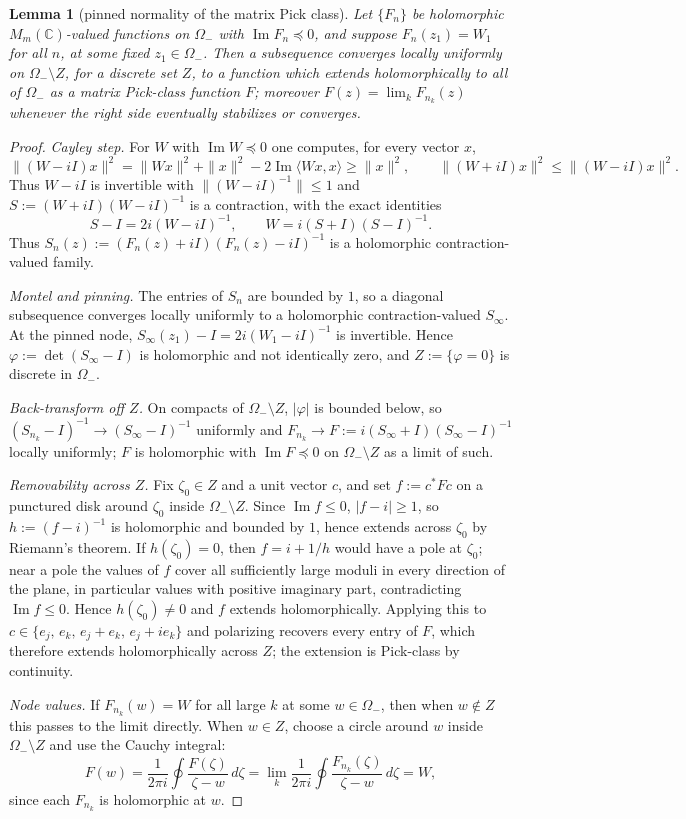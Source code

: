 \documentclass[11pt]{amsart}
\newtheorem{lemma}[theorem]{Lemma}
\theoremstyle{definition}
\theoremstyle{remark}
\theoremstyle{definition}
\renewcommand{\Im}{\operatorname{Im}}
\newcommand{\C}{\mathbb{C}}
\begin{document}
\begin{lemma}[pinned normality of the matrix Pick class]\label{lem:pinned-normality}
Let $\{F_n\}$ be holomorphic $M_m(\C)$-valued functions on $\Omega_-$ with $\Im F_n\preceq0$, and
suppose $F_n(z_1)=W_1$ for all $n$, at some fixed $z_1\in\Omega_-$.  Then a subsequence converges
locally uniformly on $\Omega_-\setminus Z$, for a discrete set $Z$, to a function which extends
holomorphically to all of $\Omega_-$ as a matrix Pick-class function $F$; moreover
$F(z)=\lim_kF_{n_k}(z)$ whenever the right side eventually stabilizes or converges.
\end{lemma}

\begin{proof}
\emph{Cayley step.}  For $W$ with $\Im W\preceq0$ one computes, for every vector $x$,
\[
   \|(W-iI)x\|^2=\|Wx\|^2+\|x\|^2-2\Im\langle Wx,x\rangle\ge\|x\|^2,
   \qquad
   \|(W+iI)x\|^2\le\|(W-iI)x\|^2 .
\]
Thus $W-iI$ is invertible with $\|(W-iI)^{-1}\|\le1$ and
$S:=(W+iI)(W-iI)^{-1}$ is a contraction, with the exact identities
\[
   S-I=2i(W-iI)^{-1},\qquad W=i(S+I)(S-I)^{-1}.
\]
Thus $S_n(z):=(F_n(z)+iI)(F_n(z)-iI)^{-1}$ is a holomorphic contraction-valued family.

\emph{Montel and pinning.}  The entries of $S_n$ are bounded by $1$, so a diagonal subsequence
converges locally uniformly to a holomorphic contraction-valued $S_\infty$.  At the pinned node,
$S_\infty(z_1)-I=2i(W_1-iI)^{-1}$ is invertible.  Hence
$\varphi:=\det(S_\infty-I)$ is holomorphic and not identically zero, and
$Z:=\{\varphi=0\}$ is discrete in $\Omega_-$.

\emph{Back-transform off $Z$.}  On compacts of $\Omega_-\setminus Z$, $|\varphi|$ is bounded below,
so $(S_{n_k}-I)^{-1}\to(S_\infty-I)^{-1}$ uniformly and
$F_{n_k}\to F:=i(S_\infty+I)(S_\infty-I)^{-1}$ locally uniformly; $F$ is holomorphic with
$\Im F\preceq0$ on $\Omega_-\setminus Z$ as a limit of such.

\emph{Removability across $Z$.}  Fix $\zeta_0\in Z$ and a unit vector $c$, and set
$f:=c^*Fc$ on a punctured disk around $\zeta_0$ inside $\Omega_-\setminus Z$.  Since
$\Im f\le0$, $|f-i|\ge1$, so $h:=(f-i)^{-1}$ is holomorphic and bounded by $1$, hence extends across
$\zeta_0$ by Riemann's theorem.  If $h(\zeta_0)=0$, then $f=i+1/h$ would have a pole at $\zeta_0$;
near a pole the values of $f$ cover all sufficiently large moduli in every direction of the plane, in
particular values with positive imaginary part, contradicting $\Im f\le0$.  Hence
$h(\zeta_0)\ne0$ and $f$ extends holomorphically.  Applying this to
$c\in\{e_j,\,e_k,\,e_j+e_k,\,e_j+ie_k\}$ and polarizing recovers every entry of $F$, which therefore
extends holomorphically across $Z$; the extension is Pick-class by continuity.

\emph{Node values.}  If $F_{n_k}(w)=W$ for all large $k$ at some $w\in\Omega_-$, then when
$w\notin Z$ this passes to the limit directly.  When $w\in Z$, choose a circle around $w$ inside
$\Omega_-\setminus Z$ and use the Cauchy integral:
\[
   F(w)=\frac1{2\pi i}\oint\frac{F(\zeta)}{\zeta-w}\,d\zeta
   =\lim_k\frac1{2\pi i}\oint\frac{F_{n_k}(\zeta)}{\zeta-w}\,d\zeta=W,
\]
since each $F_{n_k}$ is holomorphic at $w$.
\end{proof}
\end{document}
